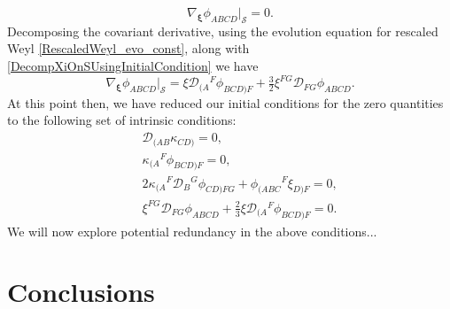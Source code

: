 \documentclass[10pt,a4paper]{article}
\theoremstyle{plain}
\begin{document}
\[ \nabla_{\bm\xi}\phi_{ABCD}\big\vert_{\mathcal{S}}=0.\]
Decomposing the covariant derivative, using the evolution equation for rescaled Weyl \eqref{RescaledWeyl_evo_const}, along with \eqref{DecompXiOnSUsingInitialCondition} we have 
\[ \nabla_{\bm\xi}\phi_{ABCD}\big\vert_{\mathcal{S}} =  \xi \mathcal{D}_{(A}{}^{F}\phi_{BCD)F} + \tfrac{3}{2} \xi^{FG} \mathcal{D}_{FG}\phi_{ABCD}. \]
At this point then, we have reduced our initial conditions for the zero quantities to the following set of intrinsic conditions:
\begin{subequations}
\begin{eqnarray}
    && \mathcal{D}_{(AB}\kappa_{CD)}=0,\\
    && \kappa_{(A}{}^F\phi_{BCD)F}=0,\\
    && 2 \kappa_{(A}{}^{F}\mathcal{D}_{B}{}^{G}\phi_{CD)FG} + \phi_{(ABC}{}^{F}\xi_{D)F} = 0,\\
    && \xi^{FG}\mathcal{D}_{FG}\phi_{ABCD} + \tfrac{2}{3}\xi\mathcal{D}_{(A}{}^F\phi_{BCD)F} = 0.
\end{eqnarray}
\end{subequations}
We will now explore potential redundancy in the above conditions...

\section*{Conclusions}
\end{document}
